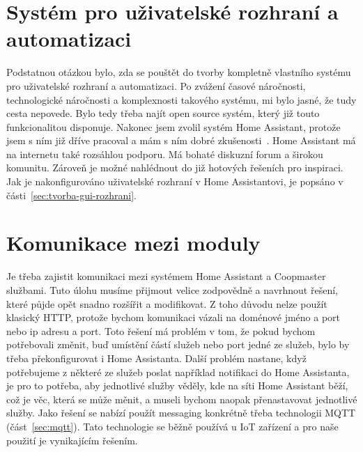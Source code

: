 \clearpage
\section{Systém pro uživatelské rozhraní a automatizaci}\label{sec:systemu-pro-uzivatelske-rozhrani-a-automatizaci}
Podstatnou otázkou bylo, zda se pouštět do tvorby kompletně vlastního systému pro uživatelské rozhraní a automatizaci.
Po zvážení časové náročnosti, technologické náročnosti a komplexnosti takového systému, mi bylo jasné, že tudy cesta nepovede.
Bylo tedy třeba najít open source systém, který již touto funkcionalitou disponuje.
Nakonec jsem zvolil systém Home Assistant, protože jsem s ním již dříve pracoval a mám s ním dobré zkušenosti~\cite{homeassistant-web}.
Home Assistant má na internetu také rozsáhlou podporu.
Má bohaté diskuzní forum a širokou komunitu.
Zároveň je možné nahlédnout do již hotových řešeních pro inspiraci.
Jak je nakonfigurováno uživatelské rozhraní v Home Assistantovi, je popsáno v části~\ref{sec:tvorba-gui-rozhrani}.

\clearpage
\section{Komunikace mezi moduly}\label{sec:komunikace-mezi-backendem-a-frontendem}
Je třeba zajistit komunikaci mezi systémem Home Assistant a Coopmaster službami.
Tuto úlohu musíme přijmout velice zodpovědně a navrhnout řešení, které půjde opět snadno rozšířit a modifikovat.
Z toho důvodu nelze použít klasický HTTP, protože bychom komunikaci vázali na doménové jméno a port nebo ip adresu a port.
Toto řešení má problém v tom, že pokud bychom potřebovali změnit, buď umístění částí služeb nebo port jedné ze služeb, bylo by třeba překonfigurovat i Home Assistanta.
Další problém nastane, když potřebujeme z některé ze služeb poslat například notifikaci do Home Assistanta, je pro to potřeba, aby jednotlivé služby věděly, kde na síti Home Assistant běží, což je věc, která se může měnit, a museli bychom naopak přenastavovat jednotlivé služby.
Jako řešení se nabízí použít messaging konkrétně třeba technologii MQTT (část~\ref{sec:mqtt}).
Tato technologie se běžně používá u IoT zařízení a pro naše použití je vynikajícím řešením.

\clearpage
